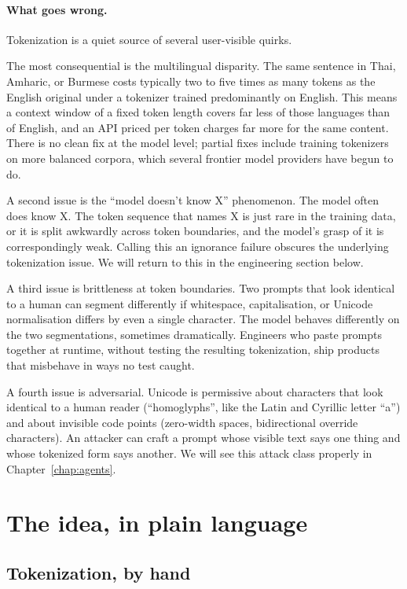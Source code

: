 \paragraph{What goes wrong.} Tokenization is a quiet source of several user-visible quirks.

The most consequential is the multilingual disparity. The same
sentence in Thai, Amharic, or Burmese costs typically two to
five times as many tokens as the English original under a
tokenizer trained predominantly on English. This means a
context window of a fixed token length covers far less of those
languages than of English, and an API priced per token charges
far more for the same content. There is no clean fix at the
model level; partial fixes include training tokenizers on more
balanced corpora, which several frontier model providers have
begun to do.

A second issue is the ``model doesn't know X'' phenomenon. The
model often does know X. The token sequence that names X is
just rare in the training data, or it is split awkwardly across
token boundaries, and the model's grasp of it is correspondingly
weak. Calling this an ignorance failure obscures the underlying
tokenization issue. We will return to this in the engineering
section below.

A third issue is brittleness at token boundaries. Two prompts
that look identical to a human can segment differently if
whitespace, capitalisation, or Unicode normalisation differs by
even a single character. The model behaves differently on the
two segmentations, sometimes dramatically. Engineers who paste
prompts together at runtime, without testing the resulting
tokenization, ship products that misbehave in ways no test
caught.

A fourth issue is adversarial. Unicode is permissive about
characters that look identical to a human reader (``homoglyphs'',
like the Latin and Cyrillic letter ``a'') and about invisible
code points (zero-width spaces, bidirectional override
characters). An attacker can craft a prompt whose visible text
says one thing and whose tokenized form says another. We will
see this attack class properly in Chapter~\ref{chap:agents}.

\section{The idea, in plain language}

\subsection*{Tokenization, by hand}

